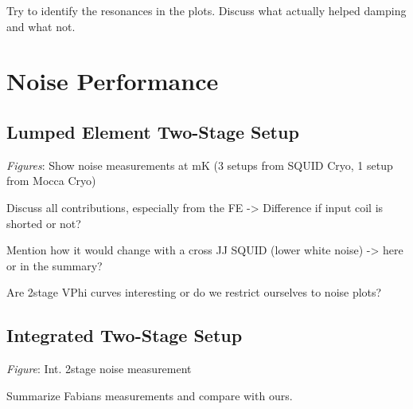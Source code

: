 Try to identify the resonances in the plots. Discuss what actually helped damping and what not. 

\section{Noise Performance}

\subsection{Lumped Element Two-Stage Setup}

\textit{Figures}: Show noise measurements at mK (3 setups from SQUID Cryo, 1 setup from Mocca Cryo) 

Discuss all contributions, especially from the FE -> Difference if input coil is shorted or not?

Mention how it would change with a cross JJ SQUID (lower white noise) -> here or in the summary?

Are 2stage VPhi curves interesting or do we restrict ourselves to noise plots?

\subsection{Integrated Two-Stage Setup}

\textit{Figure}: Int. 2stage noise measurement

Summarize Fabians measurements and compare with ours. 